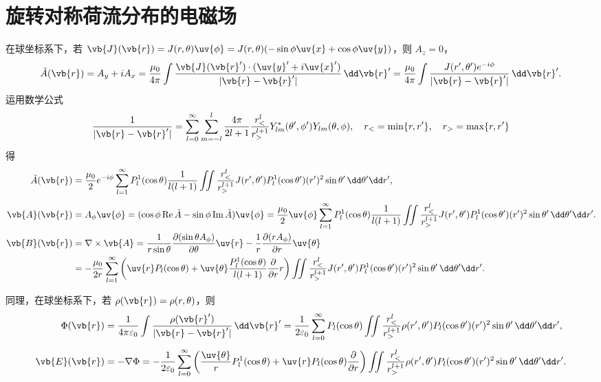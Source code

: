 \section{旋转对称荷流分布的电磁场}
在球坐标系下，若 \(\vb{J}(\vb{r}) = J(r,\theta) \uv{\phi} = J(r,\theta) (-\sin\phi \uv{x} + \cos\phi \uv{y})\)，则 \(A_z = 0\)，
\begin{align*}
	\tilde{A}(\vb{r}) = A_y + iA_x
	= \frac{\mu_0}{4\pi} \int \frac{\vb{J}(\vb{r}') \cdot (\uv{y}' + i\uv{x}')}{|\vb{r} - \vb{r}'|} \,\dd \vb{r}'
	= \frac{\mu_0}{4\pi} \int \frac{J(r',\theta') e^{-i\phi}}{|\vb{r} - \vb{r}'|} \,\dd \vb{r}'.
\end{align*}
运用数学公式
\begin{align*}
	\frac{1}{|\vb{r} - \vb{r}'|} = \sum_{l=0}^\infty \sum_{m=-l}^l \frac{4\pi}{2l+1} \frac{r_<^l}{r_>^{l+1}} Y_{lm}^*(\theta',\phi') Y_{lm}(\theta,\phi),\quad r_< = \min\{r, r'\},\quad r_> = \max\{r, r'\}
\end{align*}
得
\begin{align*}
	\tilde{A}(\vb{r})
	               & = \frac{\mu_0}{2} e^{-i\phi} \sum_{l=1}^\infty P_l^1(\cos\theta) \frac{1}{l(l+1)} \iint \frac{r_<^l}{r_>^{l+1}} J(r',\theta') P_l^1(\cos\theta') (r')^2 \sin\theta' \,\dd \theta' \dd r', \\[4pt]
	\vb{A}(\vb{r})
	               & = A_\phi \uv{\phi} = (\cos\phi \operatorname{Re}\tilde{A} - \sin\phi \operatorname{Im}\tilde{A}) \uv{\phi}
	= \frac{\mu_0}{2}\uv{\phi} \sum_{l=1}^\infty P_l^1(\cos\theta) \frac{1}{l(l+1)} \iint \frac{r_<^l}{r_>^{l+1}} J(r',\theta') P_l^1(\cos\theta') (r')^2 \sin\theta' \,\dd \theta' \dd r' .                   \\
	\vb{B}(\vb{r}) & = \nabla \times \vb{A}
	= \frac{1}{r\sin\theta} \frac{\partial (\sin\theta A_\phi)}{\partial \theta} \uv{r} - \frac{1}{r} \frac{\partial (r A_\phi)}{\partial r} \uv{\theta}
	\\&= -\frac{\mu_0}{2r} \sum_{l=1}^\infty \left( \uv{r} P_l(\cos\theta) + \uv{\theta} \frac{P_l^1(\cos\theta)}{l(l+1)} \frac{\partial}{\partial r} r \right) \iint \frac{r_<^l}{r_>^{l+1}} J(r',\theta') P_l^1(\cos\theta') (r')^2 \sin\theta' \,\dd \theta' \dd r'.
\end{align*}

同理，在球坐标系下，若 \(\rho(\vb{r}) = \rho(r,\theta)\)，则
\begin{align*}
	\Phi(\vb{r})
	 & = \frac{1}{4\pi\varepsilon_0} \int \frac{\rho(\vb{r}')}{|\vb{r} - \vb{r}'|} \,\dd \vb{r}' = \frac{1}{2\varepsilon_0} \sum_{l=0}^\infty P_l(\cos\theta) \iint \frac{r_<^l}{r_>^{l+1}} \rho(r',\theta') P_l(\cos\theta') (r')^2 \sin\theta' \,\dd \theta' \dd r',                   \\[4pt]
	\vb{E}(\vb{r})
	 & = -\nabla\Phi = -\frac{1}{2\varepsilon_0} \sum_{l=0}^\infty \left( \frac{\uv{\theta}}{r} P_l^1(\cos\theta) + \uv{r} P_l(\cos\theta) \frac{\partial}{\partial r} \right) \iint \frac{r_<^l}{r_>^{l+1}} \rho(r',\theta') P_l(\cos\theta') (r')^2 \sin\theta' \,\dd \theta' \dd r'.
\end{align*}

